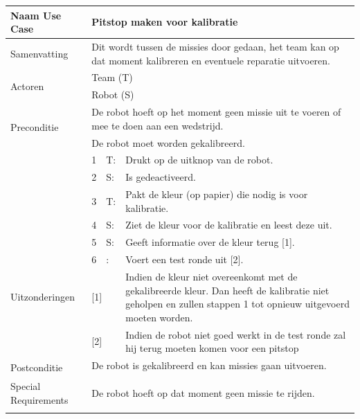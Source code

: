 \documentclass[12pt]{article} %
\begin{document}
\begin{landscape}
\begin{table}[htbp]
    \begin{tabular}{llll}
    \toprule
    Naam Use Case & \multicolumn{3}{l}{\textbf{Pitstop maken voor kalibratie}} \\
    \midrule
    Samenvatting & \multicolumn{3}{l}{Dit wordt tussen de missies door gedaan, het team kan op dat moment kalibreren en eventuele reparatie uitvoeren.} \\
    \multirow{2}[1]{*}{Actoren} & \multicolumn{3}{l}{Team (T)} \\
          & \multicolumn{3}{l}{Robot (S)} \\
    \multirow{2}[1]{*}{Preconditie} & \multicolumn{3}{l}{De robot hoeft op het moment geen missie uit te voeren of mee te doen aan een wedstrijd.} \\
          & \multicolumn{3}{l}{De robot moet worden gekalibreerd.} \\
    \multirow{6}[11]{*}{} & 1     & T:    & Drukt op de uitknop van de robot.  \\
          & 2     & S:    & Is gedeactiveerd. \\
          & 3     & T:    & Pakt de kleur (op papier) die nodig is voor kalibratie. \\
          & 4     & S:    & Ziet de kleur voor de kalibratie en leest deze uit. \\
          & 5     & S:    & Geeft informatie over de kleur terug [1]. \\
          & 6     & :     & Voert een test ronde uit [2]. \\
    Uitzonderingen & \multicolumn{2}{l}{[1]} & Indien de kleur niet overeenkomt met de gekalibreerde kleur. Dan heeft de kalibratie niet geholpen en zullen stappen 1 tot opnieuw uitgevoerd moeten worden. \\
          & \multicolumn{2}{l}{[2]} & Indien de robot niet goed werkt in de test ronde zal hij terug moeten komen voor een pitstop \\
    \multirow{2}[1]{*}{Postconditie} & \multicolumn{3}{l}{De robot is gekalibreerd en kan missies gaan uitvoeren.} \\
          & \multicolumn{3}{l}{} \\
    Special Requirements  & \multicolumn{3}{l}{De robot hoeft op dat moment geen missie te rijden.} \\
          &       &       &  \\
    \bottomrule
    \end{tabular}%
  \label{tab:addlabel}%
\end{table}%
\clearpage
\end{landscape}
\end{document}
